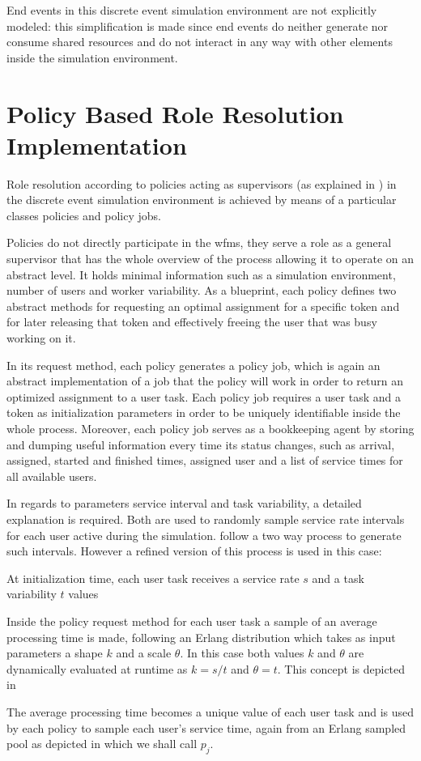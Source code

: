 End events in this discrete event simulation environment are not explicitly modeled: this simplification is made since end events do neither generate nor consume shared resources and do not interact in any way with other elements inside the simulation environment.

\section{Policy Based Role Resolution Implementation}
\label{sec:policy_implementation}

Role resolution according to policies acting as supervisors (as explained in ) in the discrete event simulation environment is achieved by means of a particular classes \ie policies and policy jobs.

Policies do not directly participate in the \gls{wfms}, they serve a role as a general supervisor that has the whole overview of the process allowing it to operate on an abstract level. It holds minimal information such as a simulation environment, number of users and worker variability. As a blueprint, each policy defines two abstract methods for requesting an optimal assignment for a specific token and for later releasing that token and effectively freeing the user that was busy working on it.

In its request method, each policy generates a policy job, which is again an abstract implementation of a job that the policy will work in order to return an optimized assignment to a user task. Each policy job requires a user task and a token as initialization parameters in order to be uniquely identifiable inside the whole process. Moreover, each policy job serves as a bookkeeping agent by storing and dumping useful information every time its status changes, such as arrival, assigned, started and finished times, assigned user and a list of service times for all available users.

In regards to parameters service interval and task variability, a detailed explanation is required. Both are used to randomly sample service rate intervals for each user active during the simulation. \citet[p. 8]{Zeng2005} follow a two way process to generate such intervals. However a refined version of this process is used in this case:
\begin{enumerate*}
	\item At initialization time, each user task receives a service rate $s$ and a task variability $t$ values
	\item Inside the policy request method for each user task a sample of an average processing time is made, following an Erlang distribution which takes as input parameters a shape $k$ and a scale $\theta$. In this case both values $k$ and $\theta$ are dynamically evaluated at runtime as $k=s/t$ and $\theta = t$. This concept is depicted in 
	\item The average processing time becomes a unique value of each user task and is used by each policy to sample each user's service time, again from an Erlang sampled pool as depicted in  which we shall call $p_j$.
\end{enumerate*}

